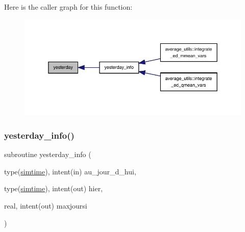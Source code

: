 Here is the caller graph for this function\+:
\nopagebreak
\begin{figure}[H]
\begin{center}
\leavevmode
\includegraphics[width=350pt]{invmondays_8f90_a793b0c319548b2101ffe071aabc0f2f2_icgraph}
\end{center}
\end{figure}
\mbox{\label{invmondays_8f90_ab24cf4964d266158f880214060f2ce53}} 
\subsubsection{\texorpdfstring{yesterday\+\_\+info()}{yesterday\_info()}}
{\footnotesize\ttfamily subroutine yesterday\+\_\+info (\begin{DoxyParamCaption}\item[{type(\hyperlink{structed__misc__coms_1_1simtime}{simtime}), intent(in)}]{au\+\_\+jour\+\_\+d\+\_\+hui,  }\item[{type(\hyperlink{structed__misc__coms_1_1simtime}{simtime}), intent(out)}]{hier,  }\item[{real, intent(out)}]{maxjoursi }\end{DoxyParamCaption})}

